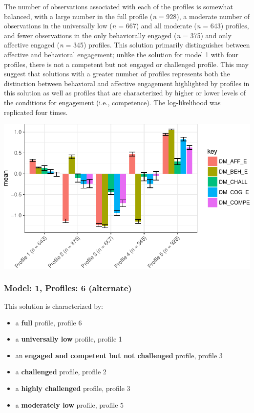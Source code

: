 \documentclass[]{msu-thesis}
\providecommand{\tightlist}{%
  \setlength{\itemsep}{0pt}\setlength{\parskip}{0pt}}
\theoremstyle{definition}
\theoremstyle{definition}
\theoremstyle{definition}
\theoremstyle{remark}
\begin{document}
The number of observations associated with each of the profiles is
somewhat balanced, with a large number in the full profile (\emph{n} =
928), a moderate number of observations in the universally low (\emph{n}
= 667) and all moderate (\emph{n} = 643) profiles, and fewer
observations in the only behaviorally engaged (\emph{n} = 375) and only
affective engaged (\emph{n} = 345) profiles. This solution primarily
distinguishes between affective and behavioral engagement; unlike the
solution for model 1 with four profiles, there is not a competent but
not engaged or challenged profile. This may suggest that solutions with
a greater number of profiles represents both the distinction between
behavioral and affective engagement highlighted by profiles in this
solution as well as profiles that are characterized by higher or lower
levels of the conditions for engagement (i.e., competence). The
log-likelihood was replicated four times.

\begin{center}\includegraphics[width=0.8\linewidth]{rosenberg-dissertation_files/figure-latex/m1_5p-1} \end{center}

\subsubsection{Model: 1, Profiles: 6
(alternate)}\label{model-1-profiles-6-alternate}

This solution is characterized by:

\begin{itemize}
\tightlist
\item
  a \textbf{full} profile, profile 6
\item
  a \textbf{universally low} profile, profile 1
\item
  an \textbf{engaged and competent but not challenged} profile, profile
  3
\item
  a \textbf{challenged} profile, profile 2
\item
  a \textbf{highly challenged} profile, profile 3
\item
  a \textbf{moderately low} profile, profile 5
\end{itemize}
\end{document}

